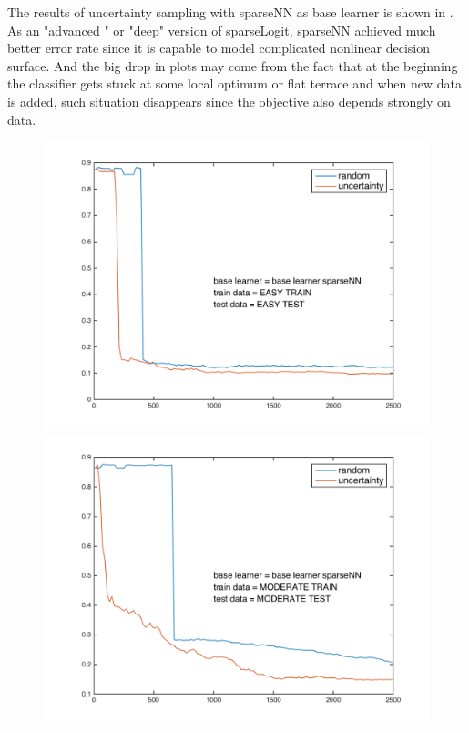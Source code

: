 \documentclass{article}
\begin{document}
The results of uncertainty sampling with sparseNN as base learner is shown in . As an "advanced " or "deep" version of sparseLogit, sparseNN achieved much better error rate since it is capable to model complicated nonlinear decision surface. And the big drop in plots may come from the fact that at the beginning the classifier gets stuck at some local optimum or flat terrace and when new data is added, such situation disappears since the objective also depends strongly on data. 
  \begin{figure}[h]
    \begin{minipage}{.31\textwidth}
      \centering
      \includegraphics[width=1\linewidth]{../sparseNN_simple}
    \end{minipage}
    \hfill
    \begin{minipage}{.31\textwidth}
      \centering
      \includegraphics[width=1\linewidth]{../sparseNN_moderate}

\end{minipage}
\end{figure}
\end{document}

